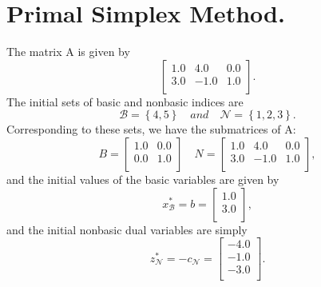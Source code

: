 \documentclass [12pt] {article}
\begin{document}
\section{Primal Simplex Method.}
The matrix A is given by
\[
\begin{bmatrix} 1.0 & 4.0 & 0.0 \\ 3.0 & -1.0 & 1.0 \\ \end{bmatrix}.
\]
The initial sets of basic and nonbasic indices are
\[
{\mathcal B} = \left \{ 4, 5 \right \}  \quad
and    \quad
{\mathcal N} = \left \{ 1, 2, 3 \right \}.
\]
Corresponding to these sets, we have the submatrices of A:
\[
B = \begin{bmatrix} 1.0 & 0.0 \\ 0.0 & 1.0 \\ \end{bmatrix}   \quad
N = \begin{bmatrix} 1.0 & 4.0 & 0.0 \\ 3.0 & -1.0 & 1.0 \\ \end{bmatrix},
\]
and the initial values of the basic variables are given by
\[
 x^*_{\mathcal B} = b = \begin{bmatrix} 1.0 \\ 3.0 \\ \end{bmatrix} ,   
\]
and the initial nonbasic dual variables are simply
\[
z^*_{\mathcal N} = -c_{\mathcal N} = \begin{bmatrix} -4.0 \\ -1.0 \\ -3.0 \\ \end{bmatrix}.
\]
\end{document}
